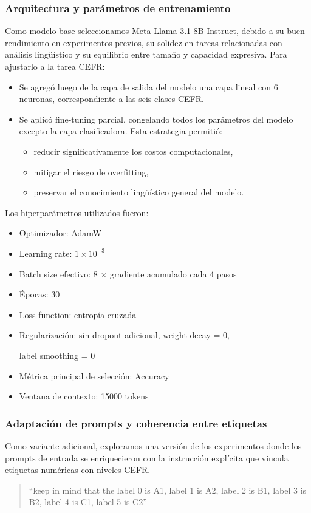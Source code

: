\subsubsection*{Arquitectura y parámetros de entrenamiento}
Como modelo base seleccionamos Meta-Llama-3.1-8B-Instruct, debido a su buen rendimiento en experimentos previos, su solidez en tareas relacionadas con análisis lingüístico y su equilibrio entre tamaño y capacidad expresiva. Para ajustarlo a la tarea CEFR:
\begin{itemize}
    \item Se agregó luego de la capa de salida del modelo una capa lineal con 6 neuronas, correspondiente a las seis clases CEFR.
    \item Se aplicó fine-tuning parcial, congelando todos los parámetros del modelo excepto la capa clasificadora. Esta estrategia permitió:
    \begin{itemize}
        \item reducir significativamente los costos computacionales,
        \item mitigar el riesgo de overfitting,
        \item preservar el conocimiento lingüístico general del modelo.
    \end{itemize}
\end{itemize}

Los hiperparámetros utilizados fueron:
\begin{itemize}
    \item Optimizador: AdamW
    \item Learning rate: $1 \times 10^{-3}$
    \item Batch size efectivo: 8 $\times$ gradiente acumulado cada 4 pasos
    \item Épocas: 30
    \item Loss function: entropía cruzada
    \item Regularización: sin dropout adicional, weight decay = 0,
    
    label smoothing = 0
    \item Métrica principal de selección: Accuracy
    \item Ventana de contexto: 15000 tokens
\end{itemize}

\subsubsection*{Adaptación de prompts y coherencia entre etiquetas}
Como variante adicional, exploramos una versión de los experimentos donde los prompts de entrada se enriquecieron con la instrucción explícita que vincula etiquetas numéricas con niveles CEFR.
\begin{quote}
``keep in mind that the label 0 is A1, label 1 is A2, label 2 is B1, label 3 is B2, label 4 is C1, label 5 is C2''
\end{quote}

